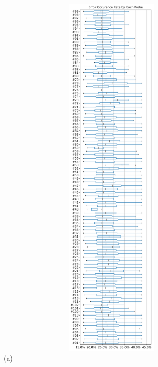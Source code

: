 \begin{figure}[!ht]
	\centering
	\begin{minipage}{0.45\textwidth}
		\centering
		\includegraphics[keepaspectratio, height=18cm, width=15cm]{figures/errors/netflix-occurence-rate-all-errors-boxplots-vert.pdf}
		\caption[Error Occurrence Rate by Each Probe]{(a)}
	\end{minipage}
	\begin{minipage}{0.45\textwidth}
		\centering

\end{minipage}
\end{figure}
